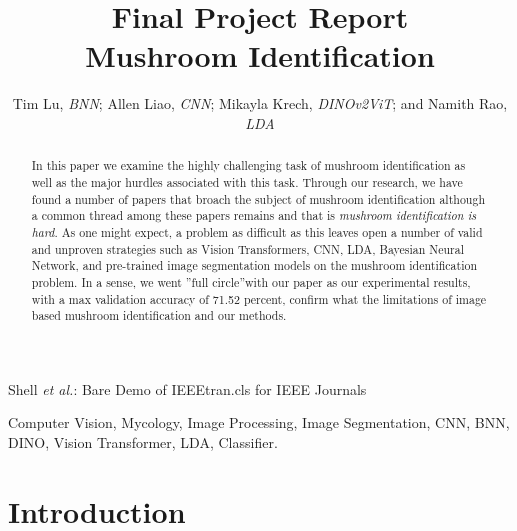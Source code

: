 \documentclass[journal]{IEEEtran}
\begin{document}
\title{Final Project Report\\ Mushroom Identification}


\author{Tim Lu, \textit{BNN}; Allen Liao, \textit{CNN}; Mikayla Krech, \textit{DINOv2ViT}; and Namith Rao, \textit{LDA}
}



%
{Shell \MakeLowercase{\textit{et al.}}: Bare Demo of IEEEtran.cls for IEEE Journals}



\maketitle

\begin{abstract}
In this paper we examine the highly challenging task of mushroom identification as well as the major hurdles associated with this task. Through our research, we have found a number of papers that broach the subject of mushroom identification although a common thread among these papers remains and that is \textit{mushroom identification is hard}. As one might expect, a problem as difficult as this leaves open a number of valid and unproven strategies such as Vision Transformers, CNN, LDA, Bayesian Neural Network, and pre-trained image segmentation models on the mushroom identification problem. In a sense, we went ''full circle''with our paper as our experimental results, with a max validation accuracy of 71.52 percent, confirm what the limitations of image based mushroom identification and our methods.
\end{abstract}

\begin{IEEEkeywords}
Computer Vision, Mycology, Image Processing, Image Segmentation, CNN, BNN, DINO, Vision Transformer, LDA, Classifier.
\end{IEEEkeywords}




\IEEEpeerreviewmaketitle



\section{Introduction}
\end{document}
